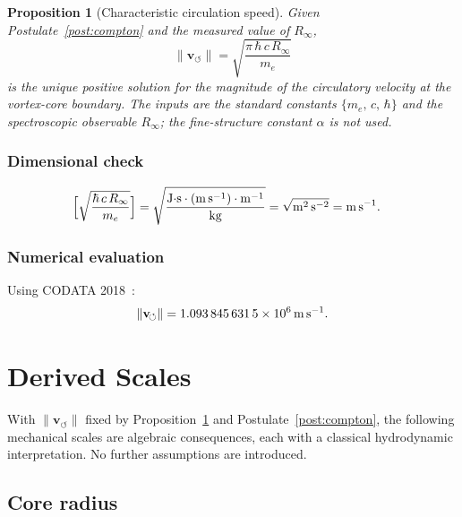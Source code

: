 \documentclass[aps,pra,preprint,longbibliography,nofootinbib]{revtex4-2}
\newtheorem{proposition}{Proposition}
\newcommand{\vnorm}{\lVert\mathbf{v}_{\!\boldsymbol{\circlearrowleft}}\rVert} %
\newcommand{\Rinf}{R_\infty}                     %
\begin{document}
\begin{proposition}[Characteristic circulation speed]
\label{prop:vc}
Given Postulate~\ref{post:compton} and the measured value of $\Rinf$,
\begin{equation}
  \boxed{
    \vnorm = \sqrt{\frac{\pi\,\hbar\,c\,\Rinf}{m_e}}
  }
  \label{eq:vc}
\end{equation}
is the unique positive solution for the magnitude of the circulatory
velocity at the vortex-core boundary.
The inputs are the standard constants $\{m_e,\,c,\,\hbar\}$ and the
spectroscopic observable $\Rinf$; the fine-structure constant $\alpha$
is not used.
\end{proposition}

\subsubsection*{Dimensional check}
\begin{align}
  \Bigl[\sqrt{\frac{\hbar\,c\,\Rinf}{m_e}}\Bigr]
  &= \sqrt{\frac{\mathrm{J{\cdot}s}\cdot(\mathrm{m\,s^{-1}})\cdot\mathrm{m}^{-1}}
                {\mathrm{kg}}}
  = \sqrt{\mathrm{m^2\,s^{-2}}}
  = \mathrm{m\,s^{-1}}. \notag
\end{align}

\subsubsection*{Numerical evaluation}
Using CODATA 2018~\cite{MohrTaylor2018}:
\begin{equation}
  \vnorm = \SI{1.093\,845\,631\,5e6}{\meter\per\second}.
  \label{eq:vc_numerical}
\end{equation}

\section{Derived Scales}
\label{sec:derived}

With $\vnorm$ fixed by Proposition~\ref{prop:vc} and
Postulate~\ref{post:compton}, the following mechanical scales
are algebraic consequences, each with a classical hydrodynamic
interpretation.
No further assumptions are introduced.

\subsection{Core radius}
\label{sec:rc}
\end{document}
